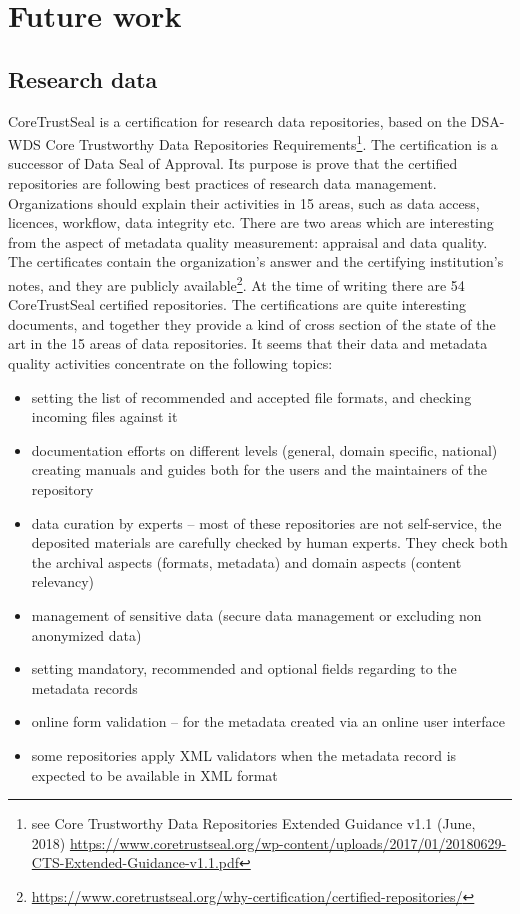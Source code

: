 \section{Future work}

\subsection{Research data}

CoreTrustSeal is a certification for research data repositories, based on the DSA-WDS Core Trustworthy Data Repositories Requirements\footnote{see Core Trustworthy Data Repositories Extended Guidance v1.1 (June, 2018) \url{https://www.coretrustseal.org/wp-content/uploads/2017/01/20180629-CTS-Extended-Guidance-v1.1.pdf}}. The certification is a successor of Data Seal of Approval. Its purpose is prove that the certified repositories are following best practices of research data management. Organizations should explain their activities in 15 areas, such as data access, licences, workflow, data integrity etc. There are two areas which are interesting from the aspect of metadata quality measurement: appraisal and data quality. The certificates contain the organization's answer and the certifying institution's notes, and they are publicly available\footnote{\url{https://www.coretrustseal.org/why-certification/certified-repositories/}}. At the time of writing there are 54 CoreTrustSeal certified repositories. The certifications are quite interesting documents, and together they provide a kind of cross section of the state of the art in the 15 areas of data repositories. It seems that their data and metadata quality activities concentrate on the following topics:

\begin{itemize}
  \setlength{\parskip}{0pt}
  \setlength{\itemsep}{0pt plus 1pt}
  \item setting the list of recommended and accepted file formats, and checking incoming files against it
  \item documentation efforts on different levels (general, domain specific, national) creating manuals and guides both for the users and the maintainers of the repository
  \item data curation by experts -- most of these repositories are not self-service, the deposited materials are carefully checked by human experts. They check both the archival aspects (formats, metadata) and domain aspects (content relevancy)
  \item management of sensitive data (secure data management or excluding non anonymized data)
  \item setting mandatory, recommended and optional fields regarding to the metadata records
  \item online form validation -- for the metadata created via an online user interface
  \item some repositories apply XML validators when the metadata record is expected to be available in XML format
\end{itemize}

